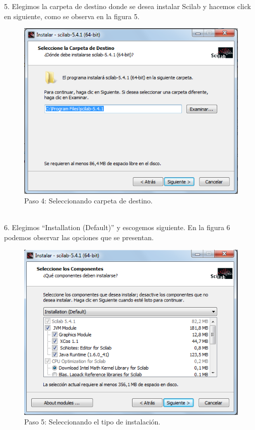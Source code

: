 \documentclass[11pt]{article} %
\begin{document}
5.	Elegimos la carpeta de destino donde se desea instalar Scilab y hacemos click en siguiente, como se observa en la figura 5.
\\%
\begin{figure}[!h]
  \centering
    \includegraphics[scale=0.5]{Captura4}
  \caption{Paso 4: Seleccionando carpeta de destino.}
  \label{fig:paso4}
\end{figure}
\\%

6.	Elegimos “Installation (Default)” y escogemos siguiente. En la figura 6 podemos observar las opciones que se presentan.
\\%
\begin{figure}[!h]
  \centering
    \includegraphics[scale=0.5]{Captura5}
  \caption{Paso 5: Seleccionando el tipo de instalación.}
  \label{fig:paso5}
\end{figure}
\\%
\end{document}
